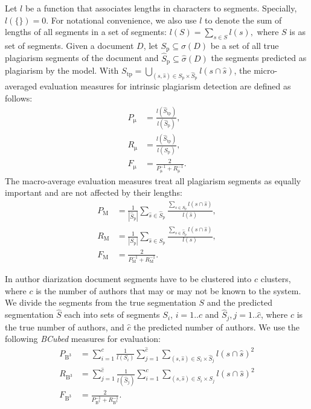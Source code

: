 \documentclass[10pt, a4paper]{article}
\begin{document}
Let $l$ be a function that associates lengths in characters to segments. Specially, $l(\{\}) = 0$. For notational convenience, we also use $l$ to denote the sum of lengths of all segments in a set of segments: $l(S) = \sum_{s\in S} l(s),$ where $S$ is as set of segments. Given a document $D$, let $S_\mathrm{p} \subseteq \sigma(D)$ be a set of all true plagiarism segments of the document and $\hat{S}_\mathrm{p} \subseteq \hat{\sigma}(D)$ the segments predicted as plagiarism by the  model. With ${S_\mathrm{tp} = \bigcup_{(s,\hat{s})\in S_\mathrm{p}\times\hat{S}_\mathrm{p}} l(s\cap\hat{s})}$, the micro-averaged evaluation measures for intrinsic plagiarism detection are defined as follows:
\begin{align}
P_\mathrm{\mu} &= \frac{l(\hat{S}_\mathrm{tp})}{l(\hat{S}_\mathrm{p})}, \\
R_\mathrm{\mu} &= \frac{l(\hat{S}_\mathrm{tp})}{l(S_\mathrm{p})}, \\
F_\mathrm{\mu} &= \frac{2}{P_\mathrm{\mu}^{-1}+R_\mathrm{\mu}^{-1}}.
\end{align}
The macro-average evaluation measures treat all plagiarism segments as equally important and are not affected by their lengths:
\begin{align}
P_\mathrm{M} &= \frac{1}{|\hat{S}_\mathrm{p}|}
	\sum_{\hat{s}\in\hat{S}_\mathrm{p}}
		\frac{{\sum_{s\in S_\mathrm{p}} l(s\cap\hat{s})}}{l(\hat{s})}, \\
R_\mathrm{M} &= \frac{1}{|S_\mathrm{p}|}
	\sum_{\hat{s}\in S_\mathrm{p}}
		\frac{{\sum_{s\in \hat{S}_\mathrm{p}} l(s\cap\hat{s})}}{l(s)}, \\
F_\mathrm{M} &= \frac{2}{P_\mathrm{M}^{-1}+R_\mathrm{M}^{-1}}.
\end{align}

In author diarization document segments have to be clustered into $c$ clusters, where $c$ is the number of authors that may or may not be known to the system. We divide the segments from the true segmentation $S$ and the predicted segmentation $\hat{S}$ each into sets of segments $S_i$, $i=1..c$ and $\hat{S}_j, j=1..\hat{c}$, where $c$ is the true number of authors, and $\hat{c}$ the predicted number of authors. We use the following \emph{BCubed} measures for evaluation:
\begin{align}
P_\mathrm{B^3} &= \sum_{i=1}^c \frac{1}{l(S_i)}\sum_{j=1}^{\hat{c}}
	\sum_{(s,\hat{s})\in S_i\times \hat{S}_j} l(s\cap \hat{s})^2 \\
R_\mathrm{B^3} &= \sum_{j=1}^{\hat{c}} \frac{1}{l(\hat{S}_j)}\sum_{i=1}^{c}
	\sum_{(s,\hat{s})\in S_i\times \hat{S}_j} l(s\cap \hat{s})^2 \\
F_\mathrm{B^3} &= \frac{2}{P_\mathrm{B^3}^{-1}+R_\mathrm{B^3}^{-1}}.
\end{align}
\end{document}
